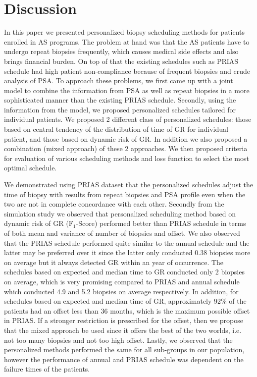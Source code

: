 
\section{Discussion}
\label{sec: discussion}
In this paper we presented personalized biopsy scheduling methods for patients enrolled in AS programs. The problem at hand was that the AS patients have to undergo repeat biopsies frequently, which causes medical side effects and also brings financial burden. On top of that the existing schedules such as PRIAS schedule had high patient non-compliance because of frequent biopsies and crude analysis of PSA. To approach these problems, we first came up with a joint model to combine the information from PSA as well as repeat biopsies in a more sophisticated manner than the existing PRIAS schedule. Secondly, using the information from the model, we proposed personalized schedules tailored for individual patients. We proposed 2 different class of personalized schedules: those based on central tendency of the distribution of time of GR for individual patient, and those based on dynamic risk of GR. In addition we also proposed a combination (mixed approach) of these 2 approaches. We then proposed criteria for evaluation of various scheduling methods and loss function to select the most optimal schedule.

We demonstrated using PRIAS dataset that the personalized schedules adjust the time of biopsy with results from repeat biopsies and PSA profile even when the two are not in complete concordance with each other. Secondly from the simulation study we observed that personalized scheduling method based on dynamic risk of GR ($\text{F}_1$-Score) performed better than PRIAS schedule in terms of both mean and variance of number of biopsies and offset. We also observed that the PRIAS schedule performed quite similar to the annual schedule and the latter may be preferred over it since the latter only conducted 0.38 biopsies more on average but it always detected GR within an year of occurrence. The schedules based on expected and median time to GR conducted only 2 biopsies on average, which is very promising compared to PRIAS and annual schedule which conducted 4.9 and 5.2 biopsies on average respectively. In addition, for schedules based on expected and median time of GR, approximately 92\% of the patients had an offset less than 36 months, which is the maximum possible offset in PRIAS. If a stronger restriction is prescribed for the offset, then we propose that the mixed approach be used since it offers the best of the two worlds, i.e. not too many biopsies and not too high offset. Lastly, we observed that the personalized methods performed the same for all sub-groups in our population, however the performance of annual and PRIAS schedule was dependent on the failure times of the patients.

